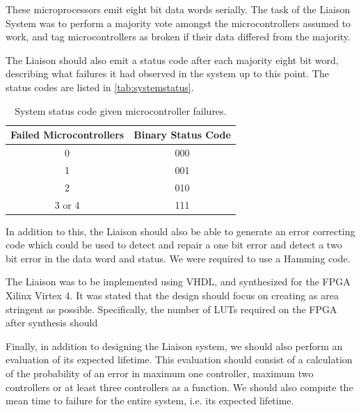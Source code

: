 These microprocessors emit eight bit data words serially. The task of
the Liaison System was to perform a majority vote amongst the
microcontrollers assumed to work, and tag microcontrollers as broken
if their data differed from the majority.

The Liaison should also emit a status code after each majority eight
bit word, describing what failures it had observed in the system up to
this point. The status codes are listed in \autoref{tab:systemstatus}.

\begin{table}[htbp]
  \centering
  \begin{tabular}{|c|c|}
    \hline
    \textbf{Failed Microcontrollers} & \textbf{Binary Status Code} \\ \hline
    0 & 000 \\ \hline
    1 & 001 \\ \hline
    2 & 010 \\ \hline
    3 or 4 & 111 \\ \hline
  \end{tabular}
  \caption{System status code given microcontroller failures.}
  \label{tab:systemstatus}
\end{table}

In addition to this, the Liaison should also be able to generate an
error correcting code which could be used to detect and repair a one
bit error and detect a two bit error in the data word and status. We
were required to use a Hamming code\cite{task}\cite{ecc}.

The Liaison was to be implemented using VHDL, and synthesized for the
FPGA Xilinx Virtex 4. It was stated that the design should focus on
creating as area stringent as possible. Specifically, the number of
LUTs required on the FPGA after synthesis should

Finally, in addition to designing the Liaison system, we should also
perform an evaluation of its expected lifetime. This evaluation should
consist of a calculation of the probability of an error in maximum one
controller, maximum two controllers or at least three controllers as a
function. We should also compute the mean time to failure for the
entire system, i.e. its expected lifetime.
